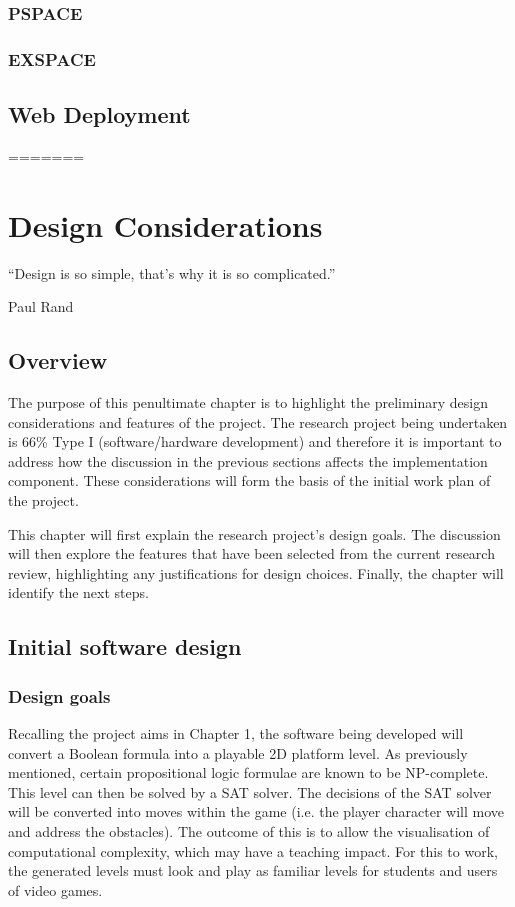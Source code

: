 \documentclass[11pt, a4paper, oneside]{report} %
\begin{document}
\subsection{PSPACE}

\subsection{EXSPACE}

\section{Web Deployment}
=======
\chapter{Design Considerations}

\epigraph{``Design is so simple, that's why it is so complicated.''}{Paul Rand}

\section{Overview}

The purpose of this penultimate chapter is to highlight the preliminary design
considerations and features of the project. The research project being
undertaken is 66\% Type I (software/hardware development) and therefore it is
important to address how the discussion in the previous sections affects the
implementation component. These considerations will form the basis of the
initial work plan of the project.

This chapter will first explain the research project's design goals. The
discussion will then explore the features that have been selected from the
current research review, highlighting any justifications for design choices.
Finally, the chapter will identify the next steps.

\section{Initial software design}

\subsection{Design goals}

Recalling the project aims in Chapter 1, the software being developed will
convert a Boolean formula into a playable 2D platform level. As previously
mentioned, certain propositional logic formulae are known to be NP-complete.
This level can then be solved by a SAT solver. The decisions of the SAT solver
will be converted into moves within the game (i.e. the player character will
move and address the obstacles). The outcome of this is to allow the
visualisation of computational complexity, which may have a teaching impact. For
this to work, the generated levels must look and play as familiar levels for
students and users of video games.
\end{document}
